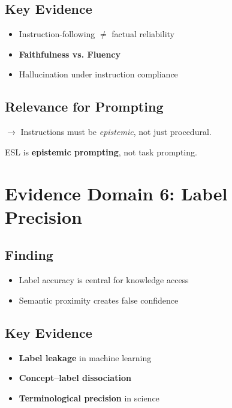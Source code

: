 \documentclass[11pt,a4paper]{article}
\begin{document}
\subsection{Key Evidence}

\begin{itemize}
    \item Instruction-following $\neq$ factual reliability
    \item \textbf{Faithfulness vs. Fluency} \citep{ji2023survey}
    \item Hallucination under instruction compliance
\end{itemize}

\subsection{Relevance for Prompting}

$\rightarrow$ Instructions must be \emph{epistemic}, not just procedural.

\begin{keypoint}
ESL is \textbf{epistemic prompting}, not task prompting.
\end{keypoint}


\section{Evidence Domain 6: Label Precision}

\subsection{Finding}

\begin{itemize}
    \item Label accuracy is central for knowledge access
    \item Semantic proximity creates false confidence
\end{itemize}

\subsection{Key Evidence}

\begin{itemize}
    \item \textbf{Label leakage} in machine learning
    \item \textbf{Concept--label dissociation}
    \item \textbf{Terminological precision} in science
\end{itemize}
\end{document}
